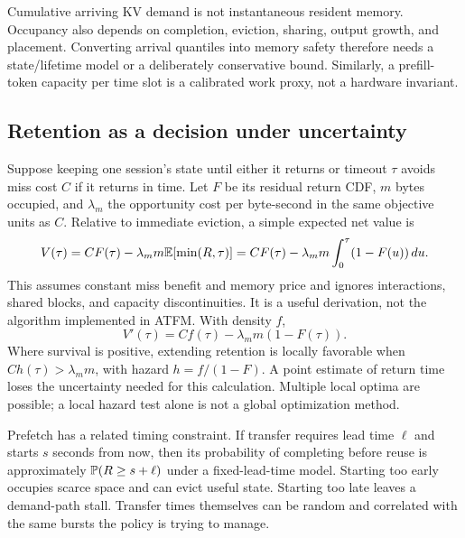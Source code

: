 Cumulative arriving KV demand is not instantaneous resident memory. Occupancy
also depends on completion, eviction, sharing, output growth, and placement.
Converting arrival quantiles into memory safety therefore needs a state/lifetime
model or a deliberately conservative bound. Similarly, a prefill-token capacity
per time slot is a calibrated work proxy, not a hardware invariant.

\subsection{Retention as a decision under uncertainty}
Suppose keeping one session's state until either it returns or timeout $\tau$
avoids miss cost $C$ if it returns in time. Let $F$ be its residual return CDF,
$m$ bytes occupied, and $\lambda_m$ the opportunity cost per byte-second in the
same objective units as $C$. Relative to immediate eviction, a simple expected
net value is
\begin{equation}
 V(\tau)=CF(\tau)-\lambda_m m\mathbb{E}[\min(R,\tau)]
 =CF(\tau)-\lambda_m m\int_0^\tau(1-F(u))\,du.
 \label{eq:retention}
\end{equation}
This assumes constant miss benefit and memory price and ignores interactions,
shared blocks, and capacity discontinuities. It is a useful derivation, not the
algorithm implemented in ATFM. With density $f$,
\begin{equation}
 V'(\tau)=Cf(\tau)-\lambda_m m(1-F(\tau)).
\end{equation}
Where survival is positive, extending retention is locally favorable when
$C h(\tau)>\lambda_m m$, with hazard $h=f/(1-F)$. A point estimate of return
time loses the uncertainty needed for this calculation. Multiple local optima
are possible; a local hazard test alone is not a global optimization method.


Prefetch has a related timing constraint. If transfer requires lead time $\ell$
and starts $s$ seconds from now, then its probability of completing before reuse
is approximately $\mathbb{P}(R\ge s+\ell)$ under a fixed-lead-time model. Starting too
early occupies scarce space and can evict useful state. Starting too late
leaves a demand-path stall. Transfer times themselves can be random and
correlated with the same bursts the policy is trying to manage.

